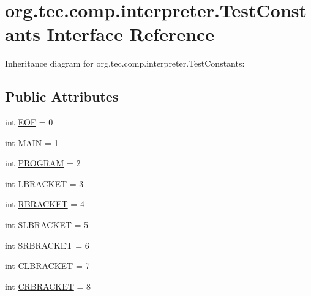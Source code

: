 \hypertarget{interfaceorg_1_1tec_1_1comp_1_1interpreter_1_1_test_constants}{}\section{org.\+tec.\+comp.\+interpreter.\+Test\+Constants Interface Reference}
\label{interfaceorg_1_1tec_1_1comp_1_1interpreter_1_1_test_constants}


Inheritance diagram for org.\+tec.\+comp.\+interpreter.\+Test\+Constants\+:
\subsection*{Public Attributes}
\begin{DoxyCompactItemize}
\item 
int \mbox{\hyperlink{interfaceorg_1_1tec_1_1comp_1_1interpreter_1_1_test_constants_a8a30f54ffa8ef81fa5787cc5492464a5}{E\+OF}} = 0
\item 
int \mbox{\hyperlink{interfaceorg_1_1tec_1_1comp_1_1interpreter_1_1_test_constants_ab879c2d2f29592fc6a088160bb92380f}{M\+A\+IN}} = 1
\item 
int \mbox{\hyperlink{interfaceorg_1_1tec_1_1comp_1_1interpreter_1_1_test_constants_ad124b6c185b97a4e2c9b772ec242440d}{P\+R\+O\+G\+R\+AM}} = 2
\item 
int \mbox{\hyperlink{interfaceorg_1_1tec_1_1comp_1_1interpreter_1_1_test_constants_a37449af54cac424f09cec174595cda3a}{L\+B\+R\+A\+C\+K\+ET}} = 3
\item 
int \mbox{\hyperlink{interfaceorg_1_1tec_1_1comp_1_1interpreter_1_1_test_constants_ad40cb7e49abae87770f9e2b016112b8c}{R\+B\+R\+A\+C\+K\+ET}} = 4
\item 
int \mbox{\hyperlink{interfaceorg_1_1tec_1_1comp_1_1interpreter_1_1_test_constants_ab80c59d18929944bfc86527c9eab8207}{S\+L\+B\+R\+A\+C\+K\+ET}} = 5
\item 
int \mbox{\hyperlink{interfaceorg_1_1tec_1_1comp_1_1interpreter_1_1_test_constants_a237f66ddd645f50791c5c6016c2701c8}{S\+R\+B\+R\+A\+C\+K\+ET}} = 6
\item 
int \mbox{\hyperlink{interfaceorg_1_1tec_1_1comp_1_1interpreter_1_1_test_constants_a107492752d82e53aa0c41581165349db}{C\+L\+B\+R\+A\+C\+K\+ET}} = 7
\item 
int \mbox{\hyperlink{interfaceorg_1_1tec_1_1comp_1_1interpreter_1_1_test_constants_a4d88a54d0008abf587d6e9be6c13e3e5}{C\+R\+B\+R\+A\+C\+K\+ET}} = 8
\item 

\end{DoxyCompactItemize}
